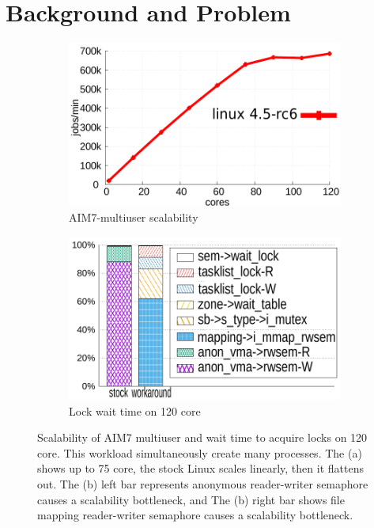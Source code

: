 \section{Background and Problem}\label{sec:bg}


\begin{figure}[h]
  \begin{subfigure}{0.45\textwidth}
    \includegraphics[width=\textwidth]{graph/aim7_default}
    \caption{AIM7-multiuser scalability}
  \end{subfigure}%
  \begin{subfigure}{0.45\textwidth}
    \includegraphics[width=\textwidth]{graph/lockstat}
    \caption{Lock wait time on 120 core}
  \end{subfigure}
  \centering
  \caption{Scalability of AIM7 multiuser and wait time to acquire locks on 120 core.
  This workload simultaneously create many processes. The (a) shows up to 75
  core, the stock Linux scales linearly, then it flattens out. The (b) left bar 
  represents anonymous reader-writer semaphore causes a scalability bottleneck, 
  and The (b) right bar shows file mapping reader-writer semaphore causes a
  scalability bottleneck.}
  \label{fig:aim7_default}
\end{figure}

